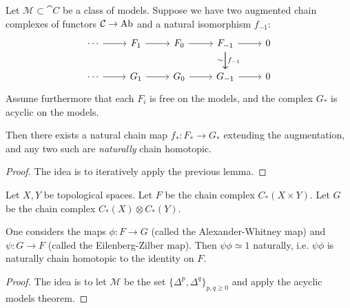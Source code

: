 \documentclass[12pt]{article}
\begin{document}
\begin{theorem}
	Let $\mathcal{M}\subset\cat{C}$ be a class of models. Suppose we have two augmented chain complexes of functors $\mathcal{C}\to\text{Ab}$ and a natural isomorphism $f_{-1}$:
	\begin{equation*}
\begin{tikzcd}
\cdots \arrow[r] & F_1 \arrow[r] & F_0 \arrow[r] & F_{-1} \arrow[r] \arrow[d, "f_{-1}"] \arrow[d, "\sim"'] & 0 \\
\cdots \arrow[r] & G_1 \arrow[r] & G_0 \arrow[r] & G_{-1} \arrow[r]                                        & 0
\end{tikzcd}
	\end{equation*}
	Assume furthermore that each $F_i$ is free on the models, and the complex $G_\ast$ is acyclic on the models.

	Then there exists a natural chain map $f_\ast:F_\ast\to G_\ast$ extending the augmentation, and any two such are \textit{naturally} chain homotopic.
\end{theorem}
\begin{proof}
	The idea is to iteratively apply the previous lemma.
\end{proof}

\begin{theorem}
	Let $X,Y$ be topological spaces. Let $F$ be the chain complex $C_\ast(X\times Y)$. Let $G$ be the chain complex $C_\ast(X)\otimes C_\ast(Y)$. 

	One considers the maps $\phi:F\to G$ (called the Alexander-Whitney map) and $\psi:G\to F$ (called the Eilenberg-Zilber map). Then $\psi\phi\simeq 1$ naturally, i.e. $\psi\phi$ is naturally chain homotopic to the identity on $F$.
\end{theorem}
\begin{proof}
	The idea is to let $\mathcal{M}$ be the set $\{\Delta^p, \Delta^q\}_{p,q\geq 0}$ and apply the acyclic models theorem.
\end{proof}

\end{document}
